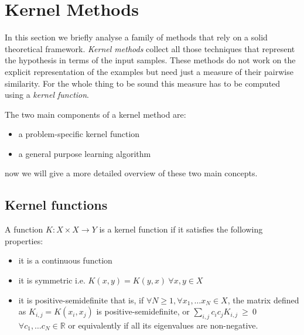 \section{Kernel Methods}
\label{sec:kernel}

In this section we briefly analyse a family of methods that rely on a solid
theoretical framework.
\emph{Kernel methods} collect all those techniques that represent the hypothesis
in terms of the input samples.
These methods do not work on the explicit representation of the examples but
need just a measure of their pairwise similarity.
For the whole thing to be sound this measure has to be computed using a
\emph{kernel function}.

The two main components of a kernel method are:
\begin{itemize}
    \item a problem-specific kernel function
    \item a general purpose learning algorithm
\end{itemize}
now we will give a more detailed overview of these two main concepts.

\subsection{Kernel functions}
\label{subsec:kernelfunc}
A function $K:X\times X \to Y$ is a kernel function if it satisfies the following properties:
\begin{itemize}
    \item it is a continuous function
    \item it is symmetric i.e. $K(x,y) = K(y,x)~\forall x,y \in X$
    \item it is positive-semidefinite that is, if $\forall N\geq 1, \forall x_1,\dots x_N \in X$,
        the matrix defined as $K_{i,j} = K(x_i,x_j)$ is positive-semidefinite,
        or $\sum_{i,j}c_ic_jK_{i,j}~\geq~0$ $\forall c_1,\dots c_N \in \mathbb{R}$
        or equivalently if all its eigenvalues are non-negative.
\end{itemize}

